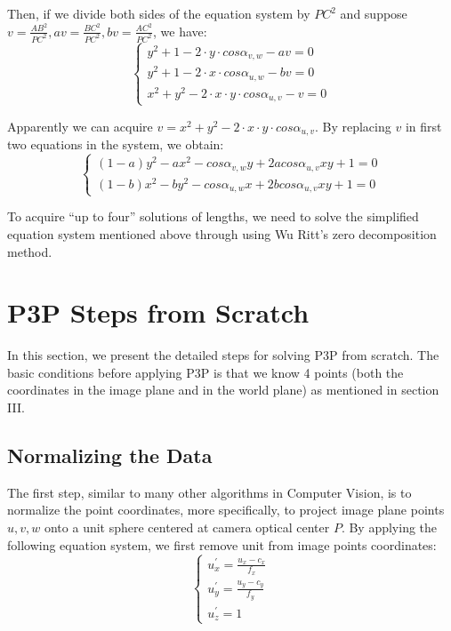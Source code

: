 \documentclass[conference]{IEEEtran}
\begin{document}
Then, if we divide both sides of the equation system by $PC^2$ and suppose  $v = \frac{AB^2}{PC^2}, av = \frac{BC^2}{PC^2}, bv = \frac{AC^2}{PC^2}$, we have:
\begin{equation}
	\begin{cases} y^2 + 1 - 2\cdot y\cdot cos\alpha _{v, w} - av = 0 \\
	 y^2 + 1 - 2\cdot x\cdot cos\alpha _{u, w} - bv = 0 \\
	 x^2 + y^2 - 2\cdot x\cdot y \cdot cos\alpha _{u, v} - v= 0 \end{cases}
\end{equation}

Apparently we can acquire $v = x^2 + y^2 - 2\cdot x\cdot y \cdot cos\alpha _{u, v}$. By replacing $v$ in first two equations in the system, we obtain:
\begin{equation}
	\begin{cases} (1 - a)y^2 - ax^2 - cos\alpha _{v, w}y + 2acos\alpha _{u, v}xy + 1 = 0 \\
	 (1 - b)x^2 - by^2 - cos\alpha _{u, w}x + 2bcos\alpha _{u, v}xy + 1 = 0 \end{cases}
\end{equation}

To acquire ``up to four'' solutions of lengths, we need to solve the simplified equation system mentioned above through using Wu Ritt's zero decomposition method\cite{gao2003complete}.

\section{P3P Steps from Scratch}
In this section, we present the detailed steps for solving P3P from scratch. The basic conditions before applying P3P is that we know 4 points (both the coordinates in the image plane and in the world plane) as mentioned in section III. 
\subsection{Normalizing the Data}
The first step, similar to many other algorithms in Computer Vision, is to normalize the point coordinates, more specifically, to project image plane points $u, v, w$ onto a unit sphere centered at camera optical center $P$. By applying the following equation system, we first remove unit from image points coordinates:
\begin{equation}
	\begin{cases}
		u_x^{\prime} = \frac{u_x - c_x}{f_x}\\
		u_y^{\prime} = \frac{u_y - c_y}{f_y}\\
		u_z^{\prime} = 1
	\end{cases}
\end{equation}
\end{document}
